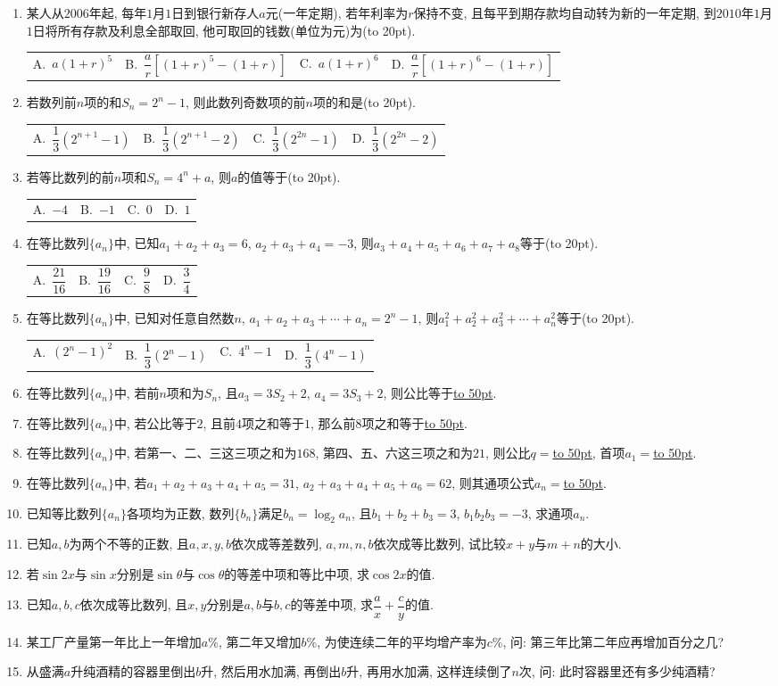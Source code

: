 \documentclass[10pt,a4paper]{article}
\newcommand{\blank}[1]{\underline{\hbox to #1pt{}}}
\newcommand{\bracket}[1]{(\hbox to #1pt{})}
\newcommand{\fourch}[4]{\par\begin{tabular}{p{.23\textwidth}p{.23\textwidth}p{.23\textwidth}p{.23\textwidth}}
A.~#1 &B.~#2& C.~#3& D.~#4
\end{tabular}}
\begin{document}
\begin{enumerate}[1.]
\fourch{$1.1^4a$}{$1.1^5a$}{$11(1.1^5-1)a$}{$10(1.1^6-1)a$}
\item 某人从$2006$年起, 每年$1$月$1$日到银行新存人$a$元(一年定期), 若年利率为$r$保持不变, 且每平到期存款均自动转为新的一年定期, 到$2010$年$1$月$1$日将所有存款及利息全部取回, 他可取回的钱数(单位为元)为\bracket{20}.
\fourch{$a(1+r)^5$}{$\dfrac ar[(1+r)^5-(1+r)]$}{$a(1+r)^6$}{$\dfrac ar[(1+r)^6-(1+r)]$}
\item 若数列前$n$项的和$S_n=2^n-1$, 则此数列奇数项的前$n$项的和是\bracket{20}.
\fourch{$\dfrac 13(2^{n+1}-1)$}{$\dfrac 13(2^{n+1}-2)$}{$\dfrac 13(2^{2n}-1)$}{$\dfrac 13(2^{2n}-2)$}
\item 若等比数列的前$n$项和$S_n=4^n+a$, 则$a$的值等于\bracket{20}.
\fourch{$-4$}{$-1$}{$0$}{$1$}
\item 在等比数列$\{a_n\}$中, 已知$a_1+a_2+a_3=6$, $a_2+a_3+a_4=-3$, 则$a_3+a_4+a_5+a_6+a_7+a_8$等于\bracket{20}.
\fourch{$\dfrac{21}{16}$}{$\dfrac{19}{16}$}{$\dfrac 98$}{$\dfrac 34$}
\item 在等比数列$\{a_n\}$中, 已知对任意自然数$n$, $a_1+a_2+a_3+\cdots +a_n=2^n-1$, 则$a_1^2+a_2^2+a_3^2+\cdots +a_n^2$等于\bracket{20}.
\fourch{$(2^n-1)^2$}{$\dfrac 13(2^n-1)$}{$4^n-1$}{$\dfrac 13(4^n-1)$}
\item 在等比数列$\{a_n\}$中, 若前$n$项和为$S_n$, 且$a_3=3S_2+2$, $a_4=3S_3+2$, 则公比等于\blank{50}.
\item 在等比数列$\{a_n\}$中, 若公比等于$2$, 且前$4$项之和等于$1$, 那么前$8$项之和等于\blank{50}.
\item 在等比数列$\{a_n\}$中, 若第一、二、三这三项之和为$168$, 第四、五、六这三项之和为$21$, 则公比$q=$\blank{50}, 首项$a_1=$\blank{50}.
\item 在等比数列$\{a_n\}$中, 若$a_1+a_2+a_3+a_4+a_5=31$, $a_2+a_3+a_4+a_5+a_6=62$, 则其通项公式$a_n=$\blank{50}.
\item 已知等比数列$\{a_n\}$各项均为正数, 数列$\{b_n\}$满足$b_n=\log _2a_n$, 且$b_1+b_2+b_3=3$, $b_1b_2b_3=-3$, 求通项$a_n$.
\item 已知$a,b$为两个不等的正数, 且$a,x,y,b$依次成等差数列, $a,m,n,b$依次成等比数列, 试比较$x+y$与$m+n$的大小.
\item 若$\sin 2x$与$\sin x$分别是$\sin \theta$与$\cos \theta$的等差中项和等比中项, 求$\cos 2x$的值.
\item 已知$a,b,c$依次成等比数列, 且$x,y$分别是$a,b$与$b,c$的等差中项, 求$\dfrac ax+\dfrac cy$的值.
\item 某工厂产量第一年比上一年增加$a\%$, 第二年又增加$b\%$, 为使连续二年的平均增产率为$c\%$, 问: 第三年比第二年应再增加百分之几?
\item 从盛满$a$升纯酒精的容器里倒出$b$升, 然后用水加满, 再倒出$b$升, 再用水加满, 这样连续倒了$n$次, 问: 此时容器里还有多少纯酒精?

\end{enumerate}
\end{document}
